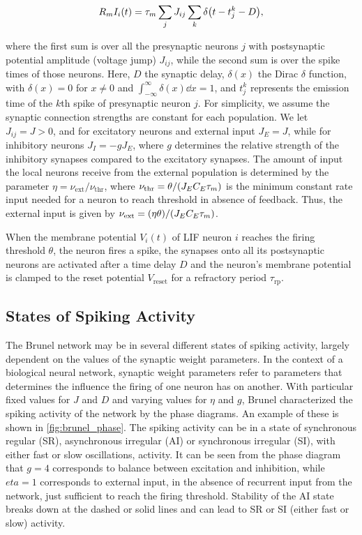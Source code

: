\begin{equation}
    R_m I_i (t) = \tau_m \sum_j J_{ij} \sum_k \delta \qty(t - t_j^k - D),
\end{equation}

where the first sum is over all the presynaptic neurons $j$ with postsynaptic potential amplitude (voltage jump) $J_{ij}$, while the second sum is over the spike times of those neurons. Here, $D$ the synaptic delay, $\delta(x)$ the Dirac $\delta$ function, with $\delta(x)=0$ for $x \neq 0$ and $\int_{-\infty}^\infty \delta (x) \dd{x} = 1$, and $t_j^k$ represents the emission time of the $k$th spike of presynaptic neuron $j$. For simplicity, we assume the synaptic connection strengths are constant for each population. We let $J_{ij}=J>0$, and for excitatory neurons and external input $J_E = J$, while for inhibitory neurons $J_I = -g J_E$, where $g$ determines the relative strength of the inhibitory synapses compared to the excitatory synapses. The amount of input the local neurons receive from the external population is determined by the parameter $\eta = \nu_\mathrm{ext}/\nu_\mathrm{thr}$, where $\nu_\mathrm{thr} = \theta / \qty(J_E C_E \tau_m)$ is the minimum constant rate input needed for a neuron to reach threshold in absence of feedback. Thus, the external input is given by $\nu_\mathrm{ext} = \qty(\eta \theta) / \qty(J_E C_E \tau_m)$.  

When the membrane potential $V_i (t)$ of LIF neuron $i$ reaches the firing threshold $\theta$, the neuron fires a spike, the synapses onto all its postsynaptic neurons are activated after a time delay $D$ and the neuron's membrane potential is clamped to the reset potential $V_\mathrm{reset}$ for a refractory period $\tau_\mathrm{rp}$.


\subsection{States of Spiking Activity}

The Brunel network may be in several different states of spiking activity, largely dependent on the values of the synaptic weight parameters. In the context of a biological neural network, synaptic weight parameters refer to parameters that determines the influence the firing of one neuron has on another. With particular fixed values for $J$ and $D$ and varying values for $\eta$ and $g$, Brunel \cite{Brunel2000} characterized the spiking activity of the network by the phase diagrams. An example of these is shown in \autoref{fig:brunel_phase}. The spiking activity can be in a state of synchronous regular (SR), asynchronous irregular (AI) or synchronous irregular (SI), with either fast or slow oscillations, activity. It can be seen from the phase diagram that $g=4$ corresponds to balance between excitation and inhibition, while $eta=1$ corresponds to external input, in the absence of recurrent input from the network, just sufficient to reach the firing threshold. Stability of the AI state breaks down at the dashed or solid lines and can lead to SR or SI (either fast or slow) activity.

